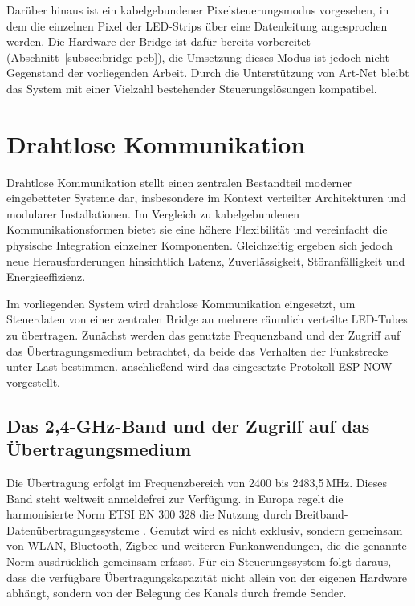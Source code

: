 Darüber hinaus ist ein kabelgebundener Pixelsteuerungsmodus vorgesehen, in dem die
einzelnen Pixel der LED-Strips über eine Datenleitung angesprochen werden. Die Hardware
der Bridge ist dafür bereits vorbereitet
(Abschnitt~\ref{subsec:bridge-pcb}), die Umsetzung dieses Modus ist jedoch nicht
Gegenstand der vorliegenden Arbeit. Durch die Unterstützung von Art-Net bleibt das System
mit einer Vielzahl bestehender Steuerungslösungen kompatibel.

\section{Drahtlose Kommunikation}
\label{sec:drahtlose-kommunikation}

Drahtlose Kommunikation stellt einen zentralen Bestandteil moderner eingebetteter
Systeme dar, insbesondere im Kontext verteilter Architekturen und modularer
Installationen. Im Vergleich zu kabelgebundenen Kommunikationsformen bietet sie eine
höhere Flexibilität und vereinfacht die physische Integration einzelner Komponenten.
Gleichzeitig ergeben sich jedoch neue Herausforderungen hinsichtlich Latenz,
Zuverlässigkeit, Störanfälligkeit und Energieeffizienz.

Im vorliegenden System wird drahtlose Kommunikation eingesetzt, um Steuerdaten von einer
zentralen Bridge an mehrere räumlich verteilte LED-Tubes zu übertragen. Zunächst werden
das genutzte Frequenzband und der Zugriff auf das Übertragungsmedium betrachtet, da
beide das Verhalten der Funkstrecke unter Last bestimmen. anschließend wird das
eingesetzte Protokoll ESP-NOW vorgestellt.

\subsection{Das 2,4-GHz-Band und der Zugriff auf das Übertragungsmedium}
\label{subsec:24ghz-medienzugriff}

Die Übertragung erfolgt im Frequenzbereich von 2400 bis 2483,5\,MHz. Dieses Band steht
weltweit anmeldefrei zur Verfügung. in Europa regelt die harmonisierte Norm
ETSI EN 300 328 die Nutzung durch Breitband-Datenübertragungssysteme
\cite{etsi_en300328}. Genutzt wird es nicht exklusiv, sondern gemeinsam von WLAN,
Bluetooth, Zigbee und weiteren Funkanwendungen, die die genannte Norm ausdrücklich
gemeinsam erfasst. Für ein Steuerungssystem
folgt daraus, dass die verfügbare Übertragungskapazität nicht allein von der eigenen
Hardware abhängt, sondern von der Belegung des Kanals durch fremde Sender.

